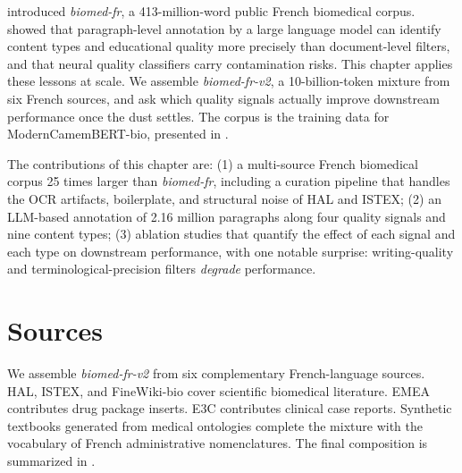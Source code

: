 \begin{reviewread}
 introduced \textit{biomed-fr}, a 413-million-word public French biomedical corpus.  showed that paragraph-level annotation by a large language model can identify content types and educational quality more precisely than document-level filters, and that neural quality classifiers carry contamination risks. This chapter applies these lessons at scale. We assemble \textit{biomed-fr-v2}, a 10-billion-token mixture from six French sources, and ask which quality signals actually improve downstream performance once the dust settles. The corpus is the training data for ModernCamemBERT-bio, presented in .
\end{reviewread}

\begin{reviewread}
The contributions of this chapter are: (1) a multi-source French biomedical corpus 25 times larger than \textit{biomed-fr}, including a curation pipeline that handles the OCR artifacts, boilerplate, and structural noise of HAL and ISTEX; (2) an LLM-based annotation of 2.16 million paragraphs along four quality signals and nine content types; (3) ablation studies that quantify the effect of each signal and each type on downstream performance, with one notable surprise: writing-quality and terminological-precision filters \emph{degrade} performance.
\end{reviewread}


\section{Sources}
\label{sec:corpus-sources}

\begin{reviewread}
We assemble \textit{biomed-fr-v2} from six complementary French-language sources. HAL, ISTEX, and FineWiki-bio cover scientific biomedical literature. EMEA contributes drug package inserts. E3C contributes clinical case reports. Synthetic textbooks generated from medical ontologies complete the mixture with the vocabulary of French administrative nomenclatures. The final composition is summarized in .
\end{reviewread}

